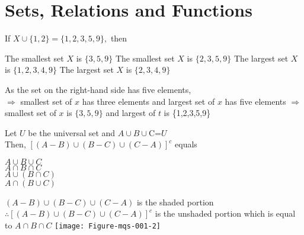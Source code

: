 \documentclass{exam}
\begin{document}
\section{Sets, Relations and Functions}

\begin{questions}

\question 
If $ X\cup \{1,2\}=\{1,2,3,5,9\},$ then
    \begin{choices}
    \correctchoice The smallest set $X$ is $\{3,5,9\} $
    \choice The smallest set $X$ is $\{2,3,5,9\}$
    \choice The largest set $X$ is $\{1,2,3,4,9\}$
    \choice The largest set $X$ is $\{2,3,4,9\}$
    \end{choices}
    \begin{solution}
    As the set on the right-hand side has five elements,\\
    $\Rightarrow$ smallest set of $ x $ has three elements and largest set of $ x $ has five elements $\Rightarrow $ smallest set of $ x $ is $\{3,5,9\}$ and largest of $ t $ is \{1,2,3,5,9\}
    \end{solution}
    
\question
Let $U$ be the universal set and $A\cup B \cup $C=$U$\\
Then, $[(A-B)\cup(B-C)\cup(C-A)]^c$ equals
    \begin{choices}
    \choice $ A \cup B\cup C $\\ 
    \correctchoice $ A \cap B \cap C $\\
    \choice $ A\cup (B \cap C ) $\\
    \choice $ A \cap (B \cup C ) $\\
    \end{choices}
    \begin{solution}
    $ (A-B)\cup(B-C)\cup(C-A) $ is the shaded portion $\therefore [(A-B)\cup(B-C)\cup (C-A)]^c$ is the unshaded portion which is equal to $ A\cap B \cap C $
    \texttt{[image: Figure-mqs-001-2]}
    \end{solution}
    
\end{questions}
\end{document}
